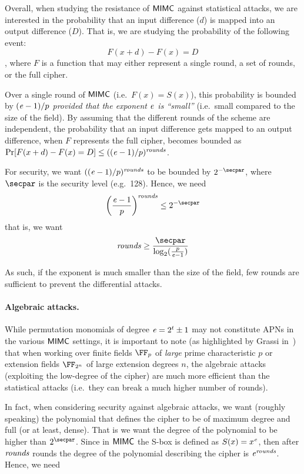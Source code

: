\medskip

Overall, when studying the resistance of $\mathsf{MIMC{}}$ against statistical attacks, we are interested in the probability that an input difference ($d$) is mapped into an output difference ($D$). That is, we are studying the probability of the following event:
\[
    F(x + d) - F(x) = D
\]
, where $F$ is a function that may either represent a single round, a set of rounds, or the full cipher.

Over a single round of $\mathsf{MIMC{}}$ (i.e.~$F(x) = S(x)$), this probability is bounded by $(\mathit{e}{}-1)/p$ \emph{provided that the exponent $\mathit{e}{}$ is ``small''} (i.e.~small compared to the size of the field).
By assuming that the different rounds of the scheme are independent, the probability that an input difference gets mapped to an output difference, when $F$ represents the full cipher, becomes bounded as $\Pr[F(x + d) - F(x) = D] \leq ((\mathit{e}{}-1)/p)^{\mathit{rounds}}$.

For security, we want $((\mathit{e}{}-1)/p)^{\mathit{rounds}}$ to be bounded by $2^{-\secpar}$, where $\secpar$ is the security level (e.g.~128). Hence, we need
\[
    \left(\frac{\exponent{}-1}{p}\right)^\rounds \leq 2^{-\secpar}
\]
that is, we want
\[
    \rounds \geq \frac{\secpar}{\log_2(\frac{p}{\exponent{}-1})}
\]

As such, if the exponent is much smaller than the size of the field, few rounds are sufficient to prevent the differential attacks.

\paragraph{Algebraic attacks.}

While permutation monomials of degree $\mathit{e}{} = 2^t \pm 1$ may not constitute APNs in the various $\mathsf{MIMC{}}$ settings, it is important to note (as highlighted by Grassi in~\cite{mimc-security-communications}) that when working over finite fields $\FFx{p}$ of \emph{large} prime characteristic $p$ or extension fields $\FFx{2^n}$ of large extension degrees $n$, the algebraic attacks (exploiting the low-degree of the cipher) are much more efficient than the statistical attacks (i.e.~they can break a much higher number of rounds).

In fact, when considering security against algebraic attacks, we want (roughly speaking) the polynomial that defines the cipher to be of maximum degree and full (or at least, dense). That is we want the degree of the polynomial to be higher than $2^{\secpar}$. Since in $\mathsf{MIMC{}}$ the S-box is defined as $S(x) = x^{\mathit{e}{}}$, then after $\mathit{rounds}$ rounds the degree of the polynomial describing the cipher is $\mathit{e}{}^{\mathit{rounds}}$. Hence, we need


